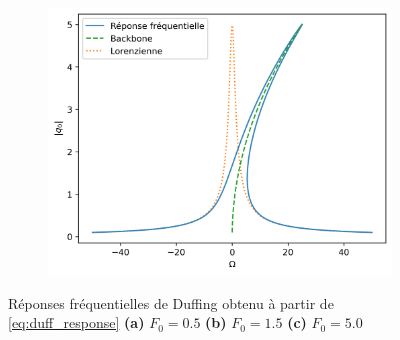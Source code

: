 \begin{figure}
\begin{subfigure}[b]{0.315\textwidth}
         \caption{}
     \end{subfigure} 
     \hfill
     \begin{subfigure}[b]{0.31\textwidth}
         \centering
         \includegraphics[width=\textwidth]{images/duffing/notitle_F0=5.0.png}
         \caption{}
         \label{fig:duff_freq_resp_3}
     \end{subfigure} 
    
    \caption{Réponses fréquentielles de Duffing obtenu à partir de \eqref{eq:duff_response} \textbf{(a)} $F_0=0.5$ \textbf{(b)} $F_0=1.5$ \textbf{(c)} $F_0=5.0$}
    \label{fig:duff_freq_resp_all}
\end{figure}

